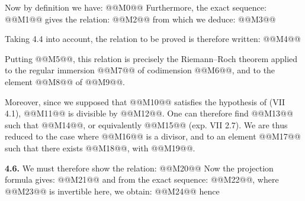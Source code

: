 Now by
definition we have:
@@M0@@
Furthermore, the exact sequence:
@@M1@@
gives the relation:
@@M2@@
from which we deduce:
@@M3@@

Taking 4.4 into account, the relation to be proved is therefore written:
@@M4@@

Putting @@M5@@, this relation is precisely the Riemann--Roch theorem applied to the regular immersion @@M7@@ of codimension @@M6@@, and to the element @@M8@@ of @@M9@@.

Moreover, since we supposed that @@M10@@ satisfies the hypothesis of (VII 4.1), @@M11@@ is divisible by @@M12@@. One can therefore find @@M13@@ such that @@M14@@, or equivalently @@M15@@ (exp. VII 2.7). We are thus reduced to the case where @@M16@@ is a divisor, and to an element @@M17@@ such that there exists @@M18@@, with @@M19@@.

\textbf{4.6.} We must therefore show the relation:
@@M20@@
Now the projection formula gives:
@@M21@@
and from the exact sequence: @@M22@@, where @@M23@@ is invertible here, we obtain:
@@M24@@
hence
